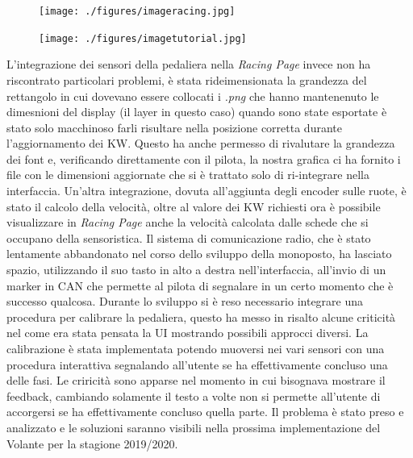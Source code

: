 \begin{figure}[h!]
    \centering
    \begin{minipage}{0.5\textwidth}
        \centering
        \texttt{[image: ./figures/imageracing.jpg]} %
    \end{minipage}\hfill
    \begin{minipage}{0.5\textwidth}
        \centering
        \texttt{[image: ./figures/imagetutorial.jpg]} %
    \end{minipage}
\end{figure}

L'integrazione dei sensori della pedaliera nella \emph{Racing Page} invece non ha riscontrato particolari problemi, è stata rideimensionata la
grandezza del rettangolo in cui dovevano essere collocati i \emph{.png} che hanno mantenenuto le dimesnioni del display (il layer in questo caso)
quando sono state esportate è stato solo macchinoso farli risultare nella posizione corretta durante l'aggiornamento dei KW.
Questo ha anche permesso di rivalutare la grandezza dei font e, verificando direttamente con il pilota, la nostra grafica ci ha fornito i file con le dimensioni
aggiornate che si è trattato solo di ri-integrare nella interfaccia.
Un'altra integrazione, dovuta all'aggiunta degli encoder sulle ruote, è stato il calcolo della velocità, oltre al valore dei KW richiesti ora
è possibile visualizzare in \emph{Racing Page} anche la velocità calcolata dalle schede che si occupano della sensoristica.
Il sistema di comunicazione radio, che è stato lentamente abbandonato nel corso dello sviluppo della monoposto, ha lasciato spazio, utilizzando
il suo tasto in alto a destra nell'interfaccia, all'invio di un marker in CAN che permette al pilota di segnalare in un certo momento che è successo 
qualcosa.
Durante lo sviluppo si è reso necessario integrare una procedura per calibrare la pedaliera, questo ha messo in risalto alcune criticità 
nel come era stata pensata la UI mostrando possibili approcci diversi.
La calibrazione è stata implementata potendo muoversi nei vari sensori con una procedura interattiva segnalando all'utente se ha effettivamente
concluso una delle fasi. Le criricità sono apparse nel momento in cui bisognava mostrare il feedback, cambiando solamente il testo a volte non si permette all'utente 
di accorgersi se ha effettivamente concluso quella parte. Il problema è stato preso e analizzato e le soluzioni saranno visibili nella prossima implementazione
del Volante per la stagione 2019/2020.  







